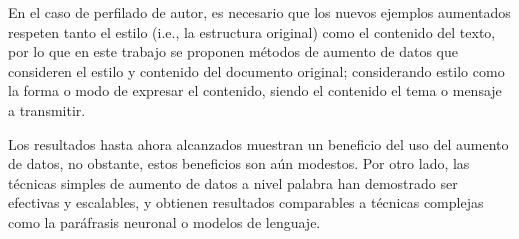 En el caso de perfilado de autor, es necesario que los nuevos ejemplos aumentados respeten tanto el estilo (i.e., la estructura original) como el contenido del texto, por lo que en este trabajo se proponen métodos de aumento de datos que consideren el estilo y contenido del documento original; considerando estilo como la forma o modo de expresar el contenido, siendo el contenido el tema o mensaje a transmitir.

Los resultados hasta ahora alcanzados muestran un beneficio del uso del aumento de datos, no obstante, estos beneficios son aún modestos. Por otro lado, las técnicas simples de aumento de datos a nivel palabra han demostrado ser efectivas y escalables, y obtienen resultados comparables a técnicas complejas como la paráfrasis neuronal o modelos de lenguaje.


